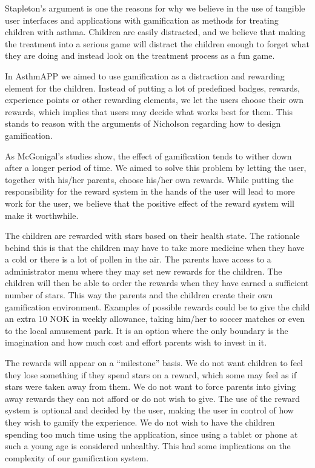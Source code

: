 Stapleton's argument is one the reasons for why we believe in the use of tangible user interfaces and applications with gamification as methods for treating children with asthma. Children are easily distracted, and we believe that making the treatment into a serious game will distract the children enough to forget what they are doing and instead look on the treatment process as a fun game.

In AsthmAPP we aimed to use gamification as a distraction and rewarding element for the children. Instead of putting a lot of predefined badges, rewards, experience points or other rewarding elements, we let the users choose their own rewards, which implies that users may decide what works best for them. This stands to reason with the arguments of Nicholson regarding how to design gamification\cite{nicholson2012user}.

As McGonigal's studies show, the effect of gamification tends to wither down after a longer period of time\cite{jane2011reality}. We aimed to solve this problem by letting the user, together with his/her parents, choose his/her own rewards. While putting the responsibility for the reward system in the hands of the user will lead to more work for the user, we believe that the positive effect of the reward system will make it worthwhile. 
 

The children are rewarded with stars based on their health state. The rationale behind this is that the children may have to take more medicine when they have a cold or there is a lot of pollen in the air. The parents have access to a administrator menu where they may set new rewards for the children. The children will then be able to order the rewards when they have earned a sufficient number of stars. This way the parents and the children create their own gamification environment. Examples of possible rewards could be to give the child an extra 10 NOK in weekly allowance, taking him/her to soccer matches or even to the local amusement park. It is an option where the only boundary is the imagination and how much cost and effort parents wish to invest in it.    


The rewards will appear on a ``milestone'' basis. We do not want children to feel they lose something if they spend stars on a reward, which some may feel as if stars were taken away from them. We do not want to force parents into giving away rewards they can not afford or do not wish to give. The use of the reward system is optional and decided by the user, making the user in control of how they wish to gamify the experience. 
We do not wish to have the children spending too much time using the application, since using a tablet or phone at such a young age is considered unhealthy. This had some implications on the complexity of our gamification system. 
